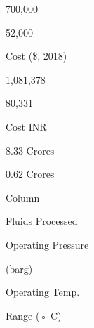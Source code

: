 \documentclass[a4paper,portrait,12pt]{article}
\begin{document}
700,000





52,000





\begin{flushleft}
Cost (\$, 2018)
\end{flushleft}





1,081,378





80,331





\begin{flushleft}
Cost INR
\end{flushleft}





\begin{flushleft}
8.33 Crores
\end{flushleft}





\begin{flushleft}
0.62 Crores
\end{flushleft}





\begin{flushleft}
Column
\end{flushleft}





\begin{flushleft}
Fluids Processed
\end{flushleft}


\begin{flushleft}
Operating Pressure
\end{flushleft}


\begin{flushleft}
(barg)
\end{flushleft}


\begin{flushleft}
Operating Temp.
\end{flushleft}


\begin{flushleft}
Range (◦ C)
\end{flushleft}
\end{document}
